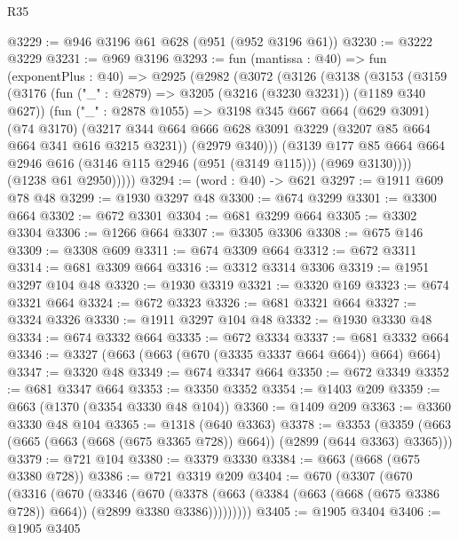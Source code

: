 \begin{lexlean}{R35}
\begin{coremodule}
@3229 := @946 @3196 @61 @628 (@951 (@952 @3196 @61))
@3230 := @3222 @3229
@3231 := @969 @3196
@3293 := fun (mantissa : @40) =>
  fun (exponentPlus : @40) =>
  @2925
    (@2982
      (@3072
        (@3126
          (@3138
            (@3153
              (@3159
                (@3176
                  (fun ("_" : @2879) => @3205 (@3216 (@3230 @3231)) (@1189 @340 @627))
                  (fun ("_" : @2878 @1055) =>
                  @3198
                    @345
                    @667
                    @664
                    (@629 @3091)
                    (@74 @3170)
                    (@3217
                      @344
                      @664
                      @666
                      @628
                      @3091
                      @3229
                      (@3207 @85 @664 @664 @341 @616 @3215 @3231))
                    (@2979 @340)))
                (@3139
                  @177
                  @85
                  @664
                  @664
                  @2946
                  @616
                  (@3146 @115 @2946 (@951 (@3149 @115)))
                  (@969 @3130))))
            (@1238 @61 @2950)))))
@3294 := (word : @40) -> @621
@3297 := @1911 @609 @78 @48
@3299 := @1930 @3297 @48
@3300 := @674 @3299
@3301 := @3300 @664
@3302 := @672 @3301
@3304 := @681 @3299 @664
@3305 := @3302 @3304
@3306 := @1266 @664
@3307 := @3305 @3306
@3308 := @675 @146
@3309 := @3308 @609
@3311 := @674 @3309 @664
@3312 := @672 @3311
@3314 := @681 @3309 @664
@3316 := @3312 @3314 @3306
@3319 := @1951 @3297 @104 @48
@3320 := @1930 @3319
@3321 := @3320 @169
@3323 := @674 @3321 @664
@3324 := @672 @3323
@3326 := @681 @3321 @664
@3327 := @3324 @3326
@3330 := @1911 @3297 @104 @48
@3332 := @1930 @3330 @48
@3334 := @674 @3332 @664
@3335 := @672 @3334
@3337 := @681 @3332 @664
@3346 := @3327 (@663 (@663 (@670 (@3335 @3337 @664 @664)) @664) @664)
@3347 := @3320 @48
@3349 := @674 @3347 @664
@3350 := @672 @3349
@3352 := @681 @3347 @664
@3353 := @3350 @3352
@3354 := @1403 @209
@3359 := @663 (@1370 (@3354 @3330 @48 @104))
@3360 := @1409 @209
@3363 := @3360 @3330 @48 @104
@3365 := @1318 (@640 @3363)
@3378 := @3353 (@3359 (@663 (@665 (@663 (@668 (@675 @3365 @728)) @664)) (@2899 (@644 @3363) @3365)))
@3379 := @721 @104
@3380 := @3379 @3330
@3384 := @663 (@668 (@675 @3380 @728))
@3386 := @721 @3319 @209
@3404 := @670
    (@3307
      (@670
        (@3316
          (@670
            (@3346
              (@670
                (@3378
                  (@663 (@3384 (@663 (@668 (@675 @3386 @728)) @664)) (@2899 @3380 @3386)))))))))
@3405 := @1905 @3404
@3406 := @1905 @3405

\end{coremodule}
\end{lexlean}
